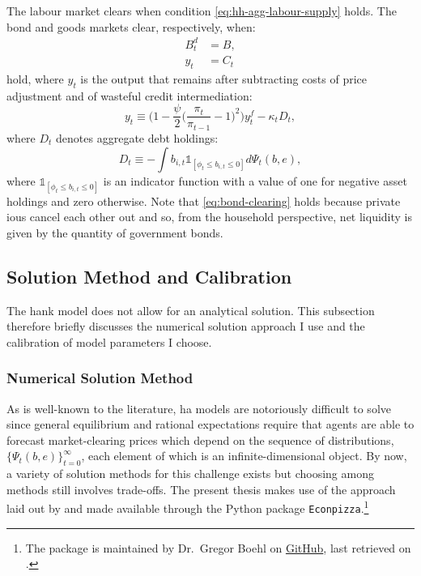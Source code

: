 \documentclass[12pt]{article} %
\numberwithin{equation}{section} %
\numberwithin{figure}{section}
\numberwithin{table}{section}
\begin{document}
The labour market clears when condition \eqref{eq:hh-agg-labour-supply} holds. The bond and goods markets clear, respectively, when:
\begin{align}
    B_t^d &= B, \label{eq:bond-clearing} \\
    y_t &= C_t \label{eq:goods-clearing}
\end{align}
hold, where $y_t$ is the output that remains after subtracting costs of price adjustment and of wasteful credit intermediation:
\begin{equation}
    y_t \equiv \Bigg( 1 - \frac{\psi}{2} \Bigg( \frac{\pi_t}{\pi_{t-1}} - 1 \Bigg)^2 \Bigg) y_t^f - \kappa_t D_t, \label{eq:effective-gdp}
\end{equation}
where $D_t$ denotes aggregate debt holdings:
\begin{equation}
    D_t \equiv - \int b_{i,t} \mathbb{1}_{[\phi_t \le b_{i,t} \le 0]} d \Psi_t (b,e), \label{eq:agg-debt}
\end{equation}
where $\mathbb{1}_{[\phi_t \le b_{i,t} \le 0]}$ is an indicator function with a value of one for negative asset holdings and zero otherwise. Note that \eqref{eq:bond-clearing} holds because private \Gls{iou}s cancel each other out and so, from the household perspective, net liquidity is given by the quantity of government bonds. 

\subsection{Solution Method and Calibration}
\label{sec:model-solution}

The \Gls{hank} model does not allow for an analytical solution. This subsection therefore briefly discusses the numerical solution approach I use and the calibration of model parameters I choose.

\subsubsection*{Numerical Solution Method}

As is well-known to the literature, \Gls{ha} models are notoriously difficult to solve since general equilibrium and rational expectations require that agents are able to forecast market-clearing prices which depend on the sequence of distributions, $\{ \Psi_t (b,e) \}_{t=0}^{\infty} $, each element of which is an infinite-dimensional object. By now, a variety of solution methods for this challenge exists but choosing among methods still involves trade-offs. The present thesis makes use of the approach laid out by \textcite{boehl2023econpizza} and made available through the Python package \texttt{Econpizza}.\footnote{The package is maintained by Dr.~Gregor Boehl on \href{https://github.com/gboehl/econpizza}{GitHub}, last retrieved on .} %
\end{document}

